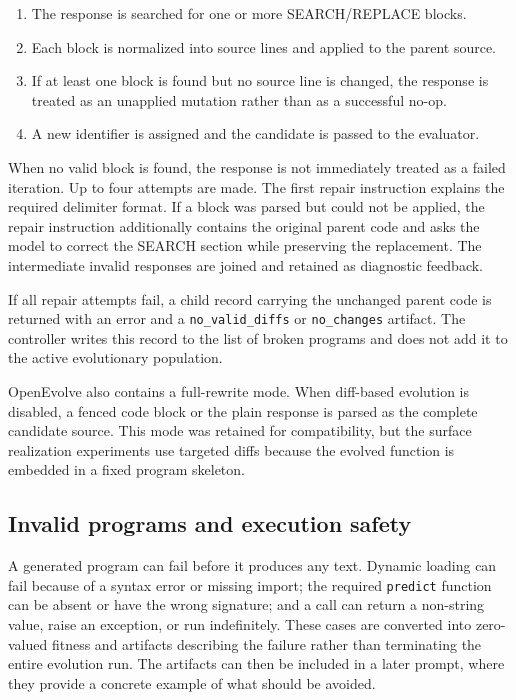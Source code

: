 \begin{enumerate}
  \item The response is searched for one or more SEARCH/REPLACE blocks.
  \item Each block is normalized into source lines and applied to the parent
  source.
  \item If at least one block is found but no source line is changed, the
  response is treated as an unapplied mutation rather than as a successful
  no-op.
  \item A new identifier is assigned and the candidate is passed to the
  evaluator.
\end{enumerate}

When no valid block is found, the response is not immediately treated as a
failed iteration. Up to four attempts are made. The first repair instruction
explains the required delimiter format. If a block was parsed but could not be
applied, the repair instruction additionally contains the original parent code
and asks the model to correct the SEARCH section while preserving the
replacement. The intermediate invalid responses are joined and retained as
diagnostic feedback.

If all repair attempts fail, a child record carrying the unchanged parent code
is returned with an error and a \texttt{no\_valid\_diffs} or \texttt{no\_changes}
artifact. The controller writes this record to the list of broken programs and
does not add it to the active evolutionary population.

OpenEvolve also contains a full-rewrite mode. When diff-based evolution is
disabled, a fenced code block or the plain response is parsed as the complete
candidate source. This mode was retained for compatibility, but the surface
realization experiments use targeted diffs because the evolved function is
embedded in a fixed program skeleton.

\subsection{Invalid programs and execution safety}

A generated program can fail before it produces any text. Dynamic loading can
fail because of a syntax error or missing import; the required \texttt{predict}
function can be absent or have the wrong signature; and a call can return a
non-string value, raise an exception, or run indefinitely. These cases are
converted into zero-valued fitness and artifacts describing the failure rather
than terminating the entire evolution run. The artifacts can then be included
in a later prompt, where they provide a concrete example of what should be
avoided.

